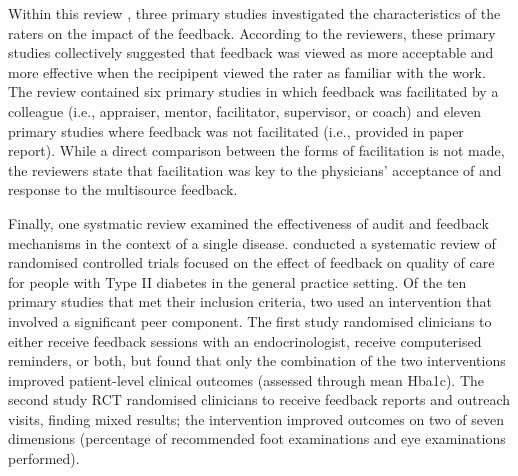 \documentclass[12pt]{article}
\begin{document}
Within this review \citep{fergusonFactorsInfluencingEffectiveness2014}, three primary studies investigated the characteristics of the raters on the impact of the feedback. According to the reviewers, these primary studies collectively suggested that feedback was viewed as more acceptable and more effective when the recipipent viewed the rater as familiar with the work. The review contained six primary studies in which feedback was facilitated by a colleague (i.e., appraiser, mentor, facilitator, supervisor, or coach) and eleven primary studies where feedback was not facilitated (i.e., provided in paper report). While a direct comparison between the forms of facilitation is not made, the reviewers state that facilitation was key to the physicians' acceptance of and response to the multisource feedback.

Finally, one systmatic review examined the effectiveness of audit and feedback mechanisms in the context of a single disease. \citet{guldbergEffectFeedbackGeneral2009} conducted a systematic review of randomised controlled trials focused on the effect of feedback on quality of care for people with Type II diabetes in the general practice setting. Of the ten primary studies that met their inclusion criteria, two used an intervention that involved a significant peer component. The first study \citep{phillipsEndocrinologistSupportedInterventionAimed2005} randomised clinicians to either receive feedback sessions with an endocrinologist, receive computerised reminders, or both, but found that only the combination of the two interventions improved patient-level clinical outcomes (assessed through mean Hba1c). The second study RCT \citep{frijlingMultifacetedSupportImprove2002} randomised clinicians to receive feedback reports and outreach visits, finding mixed results; the intervention improved outcomes on two of seven dimensions (percentage of recommended foot examinations and eye examinations performed).
\end{document}
